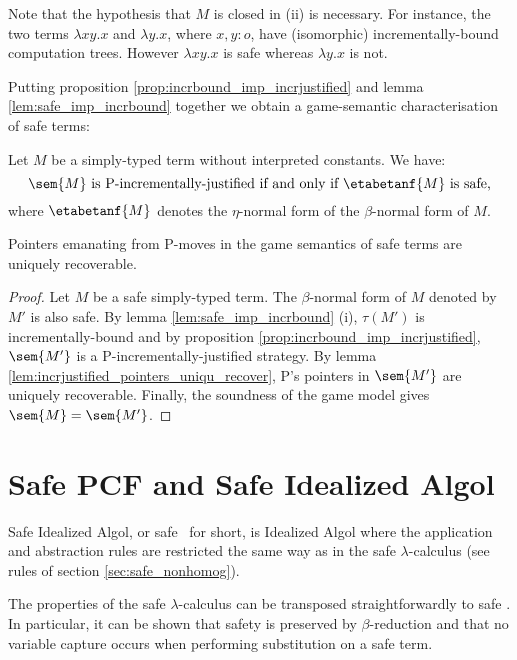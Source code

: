Note that the hypothesis that $M$ is closed in (ii) is necessary.
For instance, the two terms $\lambda x y .x$ and $\lambda y . x$,
where $x,y:o$, have (isomorphic) incrementally-bound computation
trees. However $\lambda x y .x$ is safe whereas $\lambda y . x$ is
not.



Putting proposition \ref{prop:incrbound_imp_incrjustified} and lemma
\ref{lem:safe_imp_incrbound} together we obtain a game-semantic
characterisation of safe terms:
\begin{corollary}
Let $M$ be a simply-typed term without interpreted constants. We have:
$$ \sem{M} \mbox{ is P-incrementally-justified if and only if $\etabetanf{M}$ is safe,} $$
where $\etabetanf{M}$ denotes the $\eta$-normal form of the
$\beta$-normal form of $M$.
\end{corollary}



\begin{theorem}
\label{thm:safe_ptr_recoverable} Pointers emanating from P-moves in the game semantics of
safe terms are uniquely recoverable.
\end{theorem}
\begin{proof}
Let $M$ be a safe simply-typed term. The $\beta$-normal form of $M$
denoted by $M'$ is also safe. By lemma \ref{lem:safe_imp_incrbound}
(i), $\tau(M')$ is incrementally-bound and by proposition
\ref{prop:incrbound_imp_incrjustified}, $\sem{M'}$ is a
P-incrementally-justified strategy. By lemma
\ref{lem:incrjustified_pointers_uniqu_recover}, P's pointers in
$\sem{M'}$ are uniquely recoverable. Finally, the soundness of the
game model gives $\sem{M} = \sem{M'}$.
\end{proof}


\section{Safe PCF and Safe Idealized Algol}

Safe Idealized Algol, or safe \ialgol\ for short, is Idealized Algol
where the application and abstraction rules are restricted the same
way as in the safe $\lambda$-calculus (see rules of section
\ref{sec:safe_nonhomog}).

The properties of the safe $\lambda$-calculus can be transposed
straightforwardly to safe \ialgol. In particular, it can be shown
that safety is preserved by $\beta$-reduction and that no variable
capture occurs when performing substitution on a safe term.

